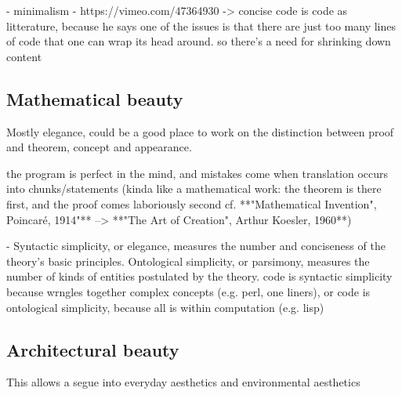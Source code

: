 - minimalism
- https://vimeo.com/47364930 -> concise code is code as litterature, because he says one of the issues is that there are just too many lines of code that one can wrap its head around. so there's a need for shrinking down content

\subsection{Mathematical beauty}

Mostly elegance, could be a good place to work on the distinction between proof and theorem, concept and appearance.

the program is perfect in the mind, and mistakes come when translation occurs into chunks/statements (kinda like a mathematical work: the theorem is there first, and the proof comes laboriously second cf. **"Mathematical Invention", Poincaré, 1914"** --> **"The Art of Creation", Arthur Koesler, 1960**)



- Syntactic simplicity, or elegance, measures the number and conciseness of the theory's basic principles. Ontological simplicity, or parsimony, measures the number of kinds of entities postulated by the theory. code is syntactic simplicity because wrngles together complex concepts (e.g. perl, one liners), or code is ontological simplicity, because all is within computation (e.g. lisp)



\subsection{Architectural beauty}

This allows a segue into everyday aesthetics and environmental aesthetics


